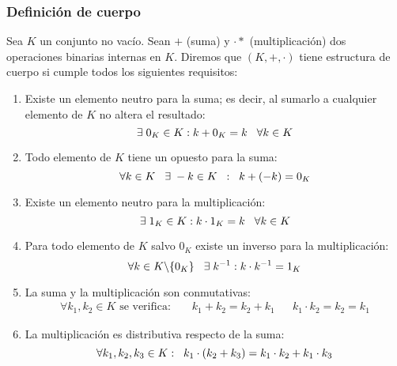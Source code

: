 \documentclass[12pt]{article}
\begin{document}
\subsubsection{Definición de cuerpo}
\hspace{3mm}
Sea $K$ un conjunto no vacío. Sean $+$ (suma) y $\cdot*$ (multiplicación) dos operaciones
binarias internas en $K$. Diremos que $(K,+,\cdot)$ tiene estructura de cuerpo si cumple
todos los siguientes requisitos:
\begin{enumerate}[label=\roman*)]
    \item Existe un elemento neutro para la suma; es decir, al sumarlo a cualquier elemento de $K$ no altera el resultado: \vspace{-4mm}
        $$\exists \hspace{1mm} 0_K \in K : k + 0_K = k \hspace{3mm} \forall k \in K$$

    \item Todo elemento de $K$ tiene un opuesto para la suma: \vspace{-4mm}
        $$\forall k \in K \hspace{3mm} \exists  \hspace{1mm}-k \in K
        \hspace{2mm} : \hspace{2mm} k + (-k) = 0_K$$

    \item Existe un elemento neutro para la multiplicación: \vspace{-4mm}
        $$\exists \hspace{1mm} 1_K \in K : k \cdot 1_K = k \hspace{3mm} \forall k \in K$$

    \item Para todo elemento de $K$ salvo $0_K$ existe un inverso para la multiplicación:
        $$\forall k \in K\backslash\{0_K\} \hspace{3mm} \exists \hspace{1mm} k^{-1}
        : k \cdot k^{-1} = 1_K$$

    \item La suma y la multiplicación son conmutativas:
        \begin{align*}
            \forall k_1, k_2 \in K \text{ se verifica: } &&
            k_1 + k_2 = k_2 + k_1 &&
            k_1 \cdot k_2 = k_2 = k_1
        \end{align*}
    
    \item La multiplicación es distributiva respecto de la suma:
        $$\forall k_1,k_2,k_3 \in K : \hspace{2mm}
        k_1 \cdot (k_2 + k_3) =
        k_1 \cdot k_2 + k_1 \cdot k_3 $$
\end{enumerate}
\end{document}
